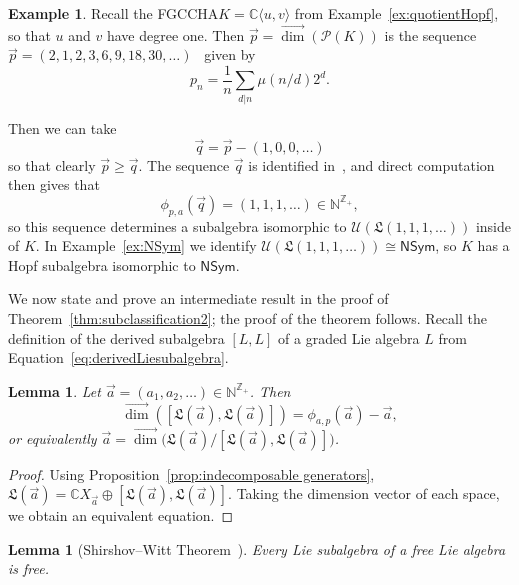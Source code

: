 \documentclass[11pt]{amsart}
\newtheorem{lemma}[theorem]{Lemma}
\theoremstyle{definition}
\newtheorem{example}[theorem]{Example}
\numberwithin{equation}{section}
\def\NN{{\mathbb N}}
\def\CC{{\mathbb C}}
\def\ZZ{{\mathbb Z}}
\newcommand{\FGCCHA}{\textsf{FGCCHA}\xspace}
\newcommand{\vecdim}{\overrightarrow{\dim}}
\begin{document}
\begin{example}
\label{ex:NSymInCxy}
Recall the \FGCCHA $K = \CC\langle u, v \rangle$ from Example~\ref{ex:quotientHopf}, so that $u$ and $v$ have degree one.  Then $\vec{p} = \vecdim(\mathcal{P}(K))$ is the sequence
$\vec{p} = (2, 1, 2, 3, 6, 9, 18, 30,\ldots)$~\cite[\href{https://oeis.org/A001037}{A001037}]{OEIS} given by 
\[
p_{n} = \frac{1}{n} \sum_{d | n} \mu(n/d) 2^{d}.
\]

Then we can take 
\[
\vec{q} = \vec{p} - (1, 0, 0, \ldots)
\]
so that clearly $\vec{p} \ge \vec{q}$.  
The sequence $\vec{q}$ is identified in~\cite[\href{https://oeis.org/A059966}{A059966}]{OEIS}, and direct computation then gives that
\[
\phi_{p, a}(\vec{q}) = (1, 1, 1, \ldots) \in \NN^{\ZZ_{+}},
\]
so this sequence determines a subalgebra isomorphic to $\mathcal{U}(\mathfrak{L}(1, 1, 1, \ldots))$ inside of $K$.   
In Example~\ref{ex:NSym} we identify $\mathcal{U}(\mathfrak{L}(1, 1, 1, \ldots)) \cong \mathsf{NSym}$, so $K$ has a Hopf subalgebra isomorphic to $\mathsf{NSym}$.
\end{example}

We now state and prove an intermediate result in the proof of Theorem~\ref{thm:subclassification2}; the proof of the theorem follows.  Recall the definition of the derived subalgebra $[L, L]$ of a graded Lie algebra $L$ from Equation~\eqref{eq:derivedLiesubalgebra}.

\begin{lemma}
\label{lem:deriveddimension}
Let $\vec{a} = (a_{1}, a_{2}, \ldots) \in \NN^{\ZZ_{+}}$.  Then
\[
\vecdim([\mathfrak{L}(\vec{a}), \mathfrak{L}(\vec{a})]) = \phi_{a, p}(\vec{a}) - \vec{a},
\]
or equivalently $\vec{a} = \vecdim\big(\mathfrak{L}(\vec{a})\big/ [\mathfrak{L}(\vec{a}), \mathfrak{L}(\vec{a})]\big)$.
\end{lemma}
\begin{proof}
Using Proposition~\ref{prop:indecomposable generators}, $ \mathfrak{L}(\vec{a}) = \CC X_{\vec{a}} \oplus [\mathfrak{L}(\vec{a}), \mathfrak{L}(\vec{a})]$.  Taking the dimension vector of each space, we obtain an equivalent equation.
\end{proof}

\begin{lemma}[Shirshov--Witt Theorem~\cite{S09, Witt56}]
\label{lem:ShiWitt}
Every Lie subalgebra of a free Lie algebra is free.
\end{lemma}
\end{document}
